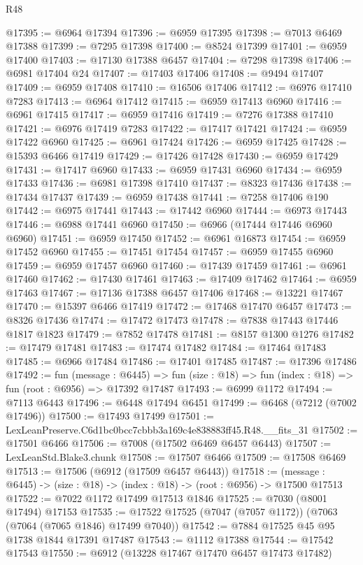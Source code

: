 \begin{lexlean}{R48}
\begin{coremodule}
@17395 := @6964 @17394
@17396 := @6959 @17395
@17398 := @7013 @6469 @17388
@17399 := @7295 @17398
@17400 := @8524 @17399
@17401 := @6959 @17400
@17403 := @17130 @17388 @6457
@17404 := @7298 @17398
@17406 := @6981 @17404 @24
@17407 := @17403 @17406
@17408 := @9494 @17407
@17409 := @6959 @17408
@17410 := @16506 @17406
@17412 := @6976 @17410 @7283
@17413 := @6964 @17412
@17415 := @6959 @17413 @6960
@17416 := @6961 @17415
@17417 := @6959 @17416
@17419 := @7276 @17388 @17410
@17421 := @6976 @17419 @7283
@17422 := @17417 @17421
@17424 := @6959 @17422 @6960
@17425 := @6961 @17424
@17426 := @6959 @17425
@17428 := @15393 @6466 @17419
@17429 := @17426 @17428
@17430 := @6959 @17429
@17431 := @17417 @6960
@17433 := @6959 @17431 @6960
@17434 := @6959 @17433
@17436 := @6981 @17398 @17410
@17437 := @8323 @17436
@17438 := @17434 @17437
@17439 := @6959 @17438
@17441 := @7258 @17406 @190
@17442 := @6975 @17441
@17443 := @17442 @6960
@17444 := @6973 @17443
@17446 := @6988 @17441 @6960
@17450 := @6966 (@17444 @17446 @6960 @6960)
@17451 := @6959 @17450
@17452 := @6961 @16873
@17454 := @6959 @17452 @6960
@17455 := @17451 @17454
@17457 := @6959 @17455 @6960
@17459 := @6959 @17457 @6960
@17460 := @17439 @17459
@17461 := @6961 @17460
@17462 := @17430 @17461
@17463 := @17409 @17462
@17464 := @6959 @17463
@17467 := @17136 @17388 @6457 @17406
@17468 := @13221 @17467
@17470 := @15397 @6466 @17419
@17472 := @17468 @17470 @6457
@17473 := @8326 @17436
@17474 := @17472 @17473
@17478 := @7838 @17443 @17446 @1817 @1823
@17479 := @7852 @17478
@17481 := @8157 @1300 @1276
@17482 := @17479 @17481
@17483 := @17474 @17482
@17484 := @17464 @17483
@17485 := @6966 @17484
@17486 := @17401 @17485
@17487 := @17396 @17486
@17492 := fun (message : @6445) =>
  fun (size : @18) => fun (index : @18) => fun (root : @6956) => @17392 @17487
@17493 := @6999 @1172
@17494 := @7113 @6443
@17496 := @6448 @17494 @6451
@17499 := @6468 (@7212 (@7002 @17496))
@17500 := @17493 @17499
@17501 := LexLeanPreserve.C6d1bc0bcc7cbbb3a169c4e838883ff45.R48.__fits_31
@17502 := @17501 @6466
@17506 := @7008 (@17502 @6469 @6457 @6443)
@17507 := LexLeanStd.Blake3.chunk
@17508 := @17507 @6466
@17509 := @17508 @6469
@17513 := @17506 (@6912 (@17509 @6457 @6443))
@17518 := (message : @6445) -> (size : @18) -> (index : @18) -> (root : @6956) -> @17500 @17513
@17522 := @7022 @1172 @17499 @17513 @1846
@17525 := @7030 (@8001 @17494) @17153
@17535 := @17522 @17525 (@7047 (@7057 @1172)) (@7063 (@7064 (@7065 @1846) @17499 @7040))
@17542 := @7884 @17525 @45 @95 @1738 @1844 @17391 @17487
@17543 := @1112 @17388
@17544 := @17542 @17543
@17550 := @6912 (@13228 @17467 @17470 @6457 @17473 @17482)

\end{coremodule}
\end{lexlean}
